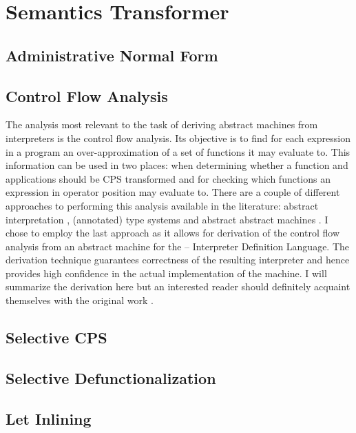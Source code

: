 \chapter{Semantics Transformer}\label{chapter:transformer}

\section{Administrative Normal Form}

\section{Control Flow Analysis}
The analysis most relevant to the task of deriving abstract machines from interpreters is the control flow analysis.
Its objective is to find for each expression in a program an over-approximation of a set of functions it may evaluate to\cite{popa}.
This information can be used in two places: when determining whether a function and applications should be CPS transformed and for checking which functions an expression in operator position may evaluate to.
There are a couple of different approaches to performing this analysis available in the literature: abstract interpretation \cite{popa}, (annotated) type systems \cite{popa} and abstract abstract machines \cite{aam}.
I chose to employ the last approach as it allows for derivation of the control flow analysis from an abstract machine for the \IDL -- Interpreter Definition Language.
The derivation technique guarantees correctness of the resulting interpreter and hence provides high confidence in the actual implementation of the machine.
I will summarize the derivation here but an interested reader should definitely acquaint themselves with the original work \cite{aam}.



\section{Selective CPS}\label{sec:selective-cps}

\section{Selective Defunctionalization}

\section{Let Inlining}